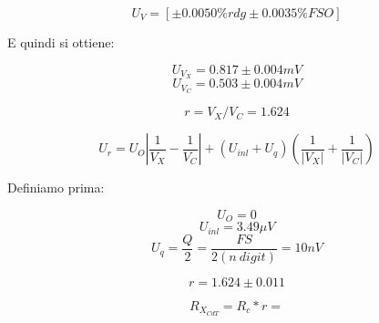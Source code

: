 \documentclass[a4paper]{article}
\begin{document}
\begin{Large} 
	\begin{equation}
		U_{V} = [\pm 0.0050\%rdg \pm 0.0035\% FSO]
	 \end{equation}
\end{Large}
E quindi si ottiene:
\begin{Large} 
	\begin{equation}
		U_{V_X} = 0.817 \pm 0.004 mV
	 \end{equation}
	 \begin{equation}
		U_{V_C} = 0.503 \pm 0.004 mV
	 \end{equation}
\end{Large}
\begin{Large}
	\begin{equation}
		r = {V_X}/{V_C}= 1.624
	 \end{equation}
\end{Large}
\begin{Large} 
	 \begin{equation}
		U_{r} = U_{O}|\frac{1}{V_X}-\frac{1}{V_C}|+(U_{inl}+U_q)(\frac{1}{|V_X|}+\frac{1}{|V_C|})
	 \end{equation}
\end{Large}
Definiamo prima:
\begin{Large}
	\begin{equation}
		U_O= 0
	 \end{equation}
	 \begin{equation}
		U_{inl} = 3.49 \mu V
	 \end{equation}
	 \begin{equation}
		U_{q} = \frac{Q}{2}= \frac{FS}{2(n\ digit)}=10nV
	 \end{equation}
\end{Large}
\begin{Large} 
	\begin{equation}
		r = 1.624 \pm 0.011
	 \end{equation}
\end{Large}
\begin{Large} 
	\begin{equation}
		R_{X_{CdT}} = R_c* r = 
	 \end{equation}
\end{Large}
\end{document}

